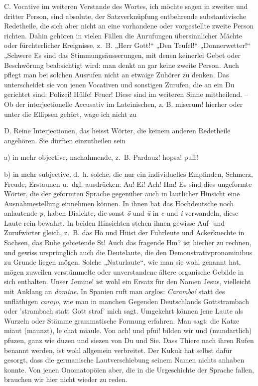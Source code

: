 \largerpage[-2]\label{IV.III.I.C}C. Vocative im weiteren Verstande des Wortes, ich möchte sagen in zweiter und dritter Person, sind absolute, der Satzverknüpfung entbehrende substantivische Redetheile, die sich aber nicht an eine vorhandene oder vorgestellte zweite Person richten. Dahin gehören in vielen Fällen die Anrufungen übersinnlicher Mächte oder fürchterlicher Ereignisse, z.~B. „Herr Gott!“ „Den Teufel!“ „Donnerwetter!“ „Schwere  Es sind das Stimmungsäusserungen, mit denen keinerlei Gebet oder Beschwörung beabsichtigt wird: man denkt an gar keine zweite Person. Auch pflegt man bei solchen Ausrufen nicht an etwaige Zuhörer zu denken. Das unterscheidet sie von jenen Vocativen und sonstigen \label{fp.313} Zurufen, die an ein Du gerichtet sind: Polizei! Hülfe! Feuer! Diese sind im weiteren Sinne mittheilend. – Ob der interjectionelle Accusativ im Lateinischen, z. B.  miserum! hierher oder unter die Ellipsen gehört, wage ich nicht zu 

\label{IV.III.I.D}D. Reine Interjectionen, das heisst Wörter, die keinem anderen Redetheile angehören. Sie dürften einzutheilen sein

\label{IV.III.I.a}a) in mehr objective, nachahmende, z.~B. Pardauz! hopsa! puff!

\label{IV.III.I.b}b) in mehr subjective, d.~h. solche, die nur ein individuelles Empfinden, \label{sp.322} Schmerz, Freude, Erstaunen u.~dgl. ausdrücken: Au! Ei! Ach! Hm! Es sind dies ungeformte Wörter, die der geformten Sprache gegenüber auch in lautlicher Hinsicht eine Ausnahmestellung einnehmen können. In ihnen hat das Hochdeutsche noch anlautende \textit{p}, haben Dialekte, die sonst \textit{ö} und \textit{ü} in \textit{e} und \textit{i} verwandeln, diese Laute rein bewahrt. In beiden Hinsichten stehen ihnen gewisse Auf- und Zurufwörter gleich, z.~B. das Hö und Hüist der Fuhrleute und Ackerknechte in Sachsen, das Ruhe gebietende St! Auch das fragende Hm? ist hierher zu rechnen, und gewiss ursprünglich auch die Deutelaute, die den Demonstrativpronominibus zu Grunde liegen mögen. Solche „Naturlaute“, wie man sie wohl genannt hat, mögen zuweilen verstümmelte oder unverstandene ältere organische Gebilde in sich enthalten. Unser Jemine! ist wohl ein Ersatz für den Namen Jesus, vielleicht mit Anklang an \textit{domine}. In Spanien ruft man arglos: \textit{Caramba!} statt des unfläthigen \textit{carajo}, wie man in manchen Gegenden Deutschlands Gottstrambach oder ’strambach statt Gott straf’ mich sagt. Umgekehrt können jene Laute als Wurzeln oder Stämme grammatische Formung erfahren. Man sagt: die Katze miaut (maunzt), le chat miaule. Von ach! und pfui! bilden wir  und (mundartlich) pfuzen, ganz wie duzen und siezen von Du und Sie. Dass Thiere nach ihren Rufen benannt werden, ist wohl allgemein verbreitet. Der Kukuk hat selbst dafür gesorgt, dass die germanische Lautverschiebung seinem Namen nichts anhaben konnte. Von jenen Onomatopöien aber, die in die Urgeschichte der Sprache fallen, brauchen wir hier nicht wieder zu reden. 

